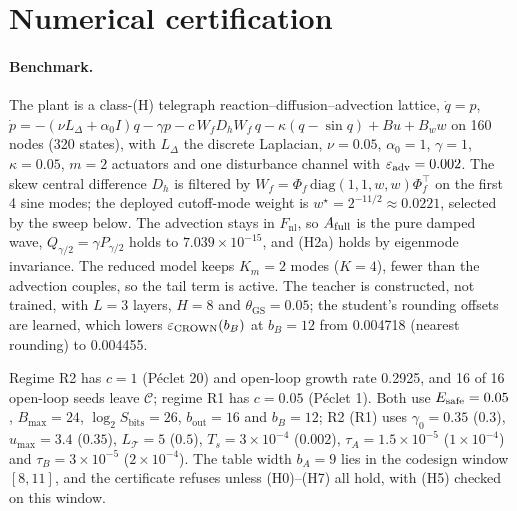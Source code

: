 \section{Numerical certification}
\label{sec:numerics}

\paragraph{Benchmark.}
The plant is a class-(H) telegraph reaction--diffusion--advection lattice, $\dot q = p$, $\dot p = -(\nu L_\Delta + \alpha_0 I)q - \gamma p - c\,W_fD_hW_f\,q - \kappa(q - \sin q) + Bu + B_ww$ on 160 nodes (320 states), with $L_\Delta$ the discrete Laplacian, $\nu = 0.05$, $\alpha_0 = 1$, $\gamma = 1$, $\kappa = 0.05$, $m = 2$ actuators and one disturbance channel with $\varepsilon_{\mathrm{adv}} = 0.002$. The skew central difference $D_h$ is filtered by $W_f = \Phi_f\,\mathrm{diag}(1, 1, w, w)\Phi_f^\top$ on the first 4 sine modes; the deployed cutoff-mode weight is $w^\star = 2^{-11/2} \approx 0.0221$, selected by the sweep below. The advection stays in $F_{\mathrm{nl}}$, so $A_{\mathrm{full}}$ is the pure damped wave, $Q_{\gamma/2} = \gamma P_{\gamma/2}$ holds to $7.039\times10^{-15}$, and (H2a) holds by eigenmode invariance. The reduced model keeps $K_m = 2$ modes ($K = 4$), fewer than the advection couples, so the tail term is active. The teacher is constructed, not trained, with $L = 3$ layers, $H = 8$ and $\theta_{\mathrm{GS}} = 0.05$; the student's rounding offsets are learned, which lowers $\varepsilon_{\mathrm{CROWN}}(b_B)$ at $b_B = 12$ from 0.004718 (nearest rounding) to 0.004455.

Regime R2 has $c = 1$ (P\'eclet 20) and open-loop growth rate 0.2925, and 16 of 16 open-loop seeds leave $\mathcal{C}$; regime R1 has $c = 0.05$ (P\'eclet 1). Both use $E_{\mathrm{safe}} = 0.05$, $B_{\max} = 24$, $\log_2 S_{\mathrm{bits}} = 26$, $b_{\mathrm{out}} = 16$ and $b_B = 12$; R2 (R1) uses $\gamma_0 = 0.35$ ($0.3$), $u_{\max} = 3.4$ ($0.35$), $L_{\mathcal{T}} = 5$ ($0.5$), $T_s = 3\times10^{-4}$ ($0.002$), $\tau_A = 1.5\times10^{-5}$ ($1\times10^{-4}$) and $\tau_B = 3\times10^{-5}$ ($2\times10^{-4}$). The table width $b_A = 9$ lies in the codesign window $[8, 11]$, and the certificate refuses unless (H0)--(H7) all hold, with (H5) checked on this window.

